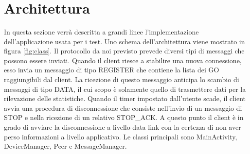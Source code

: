 \documentclass{llncs}
\begin{document}


\section{Architettura}

\paragraph{} In questa sezione verrà descritta a grandi linee l'implementazione dell'applicazione usata per i test. Uno schema dell'architettura viene mostrato in figura \ref{fig:class}. Il protocollo da noi previsto prevede diversi tipi di messaggi che possono essere inviati. Quando il client
riesce a stabilire una nuova connessione, esso invia un messaggio di tipo REGISTER che contiene la lista dei GO raggiungibili dal client. La ricezione di questo messaggio anticipa lo scambio di messaggi di tipo DATA, il cui scopo
è solamente quello di trasmettere dati per la rilevazione delle statistiche. Quando il timer impostato dall'utente scade, il client avvia una procedura di disconnessione che consiste nell'invio di un messaggio di STOP e nella ricezione 
di un relativo STOP\_ACK. A questo punto il client è in grado di avviare la disconnessione a livello data link con la certezza di non aver perso informazioni a livello applicativo.
Le classi principali sono MainActivity, DeviceManager, Peer e MessageManager.
\end{document}
